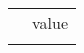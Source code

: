 \documentclass[10pt,a4paper]{article}
\author{Sebastian}
\begin{document}
\begin{tabular}{l l}
{%
{{ key }} & {{ value }} \\
{%
\end{tabular}
\end{document}
